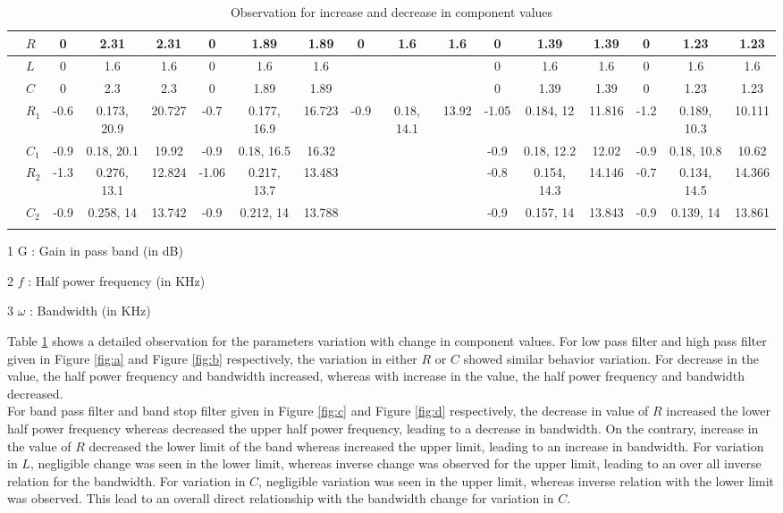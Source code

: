 \documentclass{lab_sheet}
\begin{document}
\begin{table}
\begin{threeparttable}
\begin{tabularx}{\textwidth}{@{}||>{\centering\arraybackslash}X||>{\centering\arraybackslash}X||*{5}{c|c|c||}@{}}
   \cline{1-17}
   \multirow{3}{*}{\ref{fig:e}}&$R$&0&2.31&2.31&0&1.89&1.89&\multirow{3}{*}{0}&\multirow{3}{*}{1.6}&\multirow{3}{*}{1.6}&0&1.39&1.39&0&1.23&1.23\\
   \cline{2-8}\cline{12-17}
   &$L$&0&1.6&1.6&0&1.6&1.6&&&&0&1.6&1.6&0&1.6&1.6\\
   \cline{2-8}\cline{12-17}
   &$C$&0&2.3&2.3&0&1.89&1.89&&&&0&1.39&1.39&0&1.23&1.23\\
   \cline{1-17}
   \multirow{4}{*}{\ref{fig:f}}&$R_1$&-0.6&0.173, 20.9&20.727&-0.7&0.177, 16.9&16.723&\multirow{4}{*}{-0.9}&\multirow{4}{*}{0.18, 14.1}&\multirow{4}{*}{13.92}&-1.05&0.184, 12&11.816&-1.2&0.189, 10.3&10.111\\
   \cline{2-8}\cline{12-17}
   &$C_1$&-0.9&0.18, 20.1&19.92&-0.9&0.18, 16.5&16.32&&&&-0.9&0.18, 12.2&12.02&-0.9&0.18, 10.8&10.62\\
   \cline{2-8}\cline{12-17}
   &$R_2$&-1.3&0.276, 13.1&12.824&-1.06&0.217, 13.7&13.483&&&&-0.8&0.154, 14.3&14.146&-0.7&0.134, 14.5&14.366\\
   \cline{2-8}\cline{12-17}
   &$C_2$&-0.9&0.258, 14&13.742&-0.9&0.212, 14&13.788&&&&-0.9&0.157, 14&13.843&-0.9&0.139, 14&13.861\\
   \cline{1-17}
\end{tabularx}   
 \begin{tablenotes}
    \item[1] G : Gain in pass band (in dB)
    \item[2] $f$ : Half power frequency (in KHz)
    \item[3] $\omega$ : Bandwidth (in KHz)
   \end{tablenotes}
\end{threeparttable}
  \caption{Observation for increase and decrease in component values}
  \label{tbl:obs}
\end{table}
\newpage
Table \ref{tbl:obs} shows a detailed observation for the parameters variation with change in component values. For low pass filter and high pass filter given in Figure \ref{fig:a} and Figure \ref{fig:b} respectively, the variation in either $R$ or $C$ showed similar behavior variation. For decrease in the value, the half power frequency and bandwidth increased, whereas with increase in the value, the half power frequency and bandwidth decreased.\\
For band pass filter and band stop filter given in Figure \ref{fig:c} and Figure \ref{fig:d} respectively, the decrease in value of $R$ increased the lower half power frequency whereas decreased the upper half power frequency, leading to a decrease in bandwidth. On the contrary, increase in the value of $R$ decreased the lower limit of the band whereas increased the upper limit, leading to an increase in bandwidth. For variation in $L$, negligible change was seen in the lower limit, whereas inverse change was observed for the upper limit, leading to an over all inverse relation for the bandwidth. For variation in $C$, negligible variation was seen in the upper limit, whereas inverse relation with the lower limit was observed. This lead to an overall direct relationship with the bandwidth change for variation in $C$. 
\end{document}
